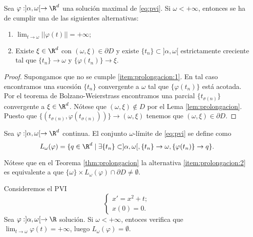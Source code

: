 \documentclass{article}
\begin{document}
\begin{theorem}
  \label{thm:prolongacion}
  Sea $\varphi : ]\alpha, \omega[ \to \R^d$ una solución maximal de \eqref{eq:pvi}. Si
  $\omega < +\infty$, entonces se ha de cumplir una de las siguientes alternativas:
  \begin{enumerate}
  \item\label{item:prolongacion:1} $\lim_{t \to \omega} ||\varphi(t)|| = +\infty$;
  \item\label{item:prolongacion:2} Existe $\xi \in \R^d$ con $(\omega, \xi) \in \partial D$ y existe
    $\{t_n\} \subset ]\alpha, \omega[$ estrictamente creciente tal que $\{t_n\} \to \omega$ y
    $\{\varphi(t_n)\} \to \xi$.
  \end{enumerate}
\end{theorem}
\begin{proof}
  Supongamos que no se cumple \ref{item:prolongacion:1}. En tal caso encontramos una sucesión
  $\{t_n\}$ convergente a $\omega$ tal que $\{\varphi(t_n)\}$ está acotada. Por el teorema de
  Bolzano-Weierstrass encontramos una parcial $\{t_{\sigma(n)}\}$ convergente a $\xi \in
  \R^d$. Nótese que $(\omega, \xi) \not \in D$ por el Lema \ref{lem:prolongacion}. Puesto que
  $\{(t_{\sigma(n)}, \varphi(t_{\sigma(n)}))\} \to (\omega, \xi)$ tenemos que
  $(\omega, \xi) \in \partial D$.
\end{proof}

\begin{definition}
  Sea $\varphi: ]\alpha, \omega[ \to \R^d$ continua. El conjunto $\omega$-límite de \eqref{eq:pvi}
  se define como
  \[L_{\omega}(\varphi) = \{q \in \R^d \mid \exists \{t_n\} \subset ]\alpha, \omega[, \{t_n\} \to
    \omega, \{\varphi(t_n)\} \to q\}.\]
\end{definition}

\begin{remark}
  Nótese que en el Teorema \ref{thm:prolongacion} la alternativa \ref{item:prolongacion:2} es
  equivalente a que $\{\omega\} \times L_{\omega}(\varphi) \cap \partial D \ne \emptyset$.
\end{remark}

\begin{ex}
  Consideremos el PVI
  \[
    \begin{cases}
      x' = x^2 + t; \\
      x(0) = 0.
    \end{cases}
  \]
  Sea $\varphi: ]\alpha, \omega[ \to \R$ solución. Si $\omega < +\infty$, entoces verifica que
  $\lim_{t \to \omega} \varphi(t) = + \infty$, luego $L_{\omega}(\varphi) = \emptyset$.
\end{ex}
\end{document}
